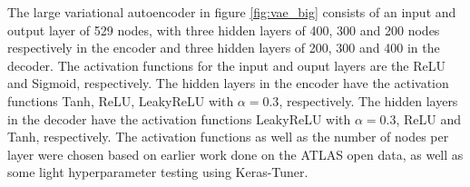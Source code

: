 The large variational autoencoder in figure \ref{fig:vae_big} consists of an input and output layer of 529 nodes, with three 
hidden layers of 400, 300 and 200 nodes respectively in the encoder and three hidden layers of 200, 300 and 400 in the decoder. 
The activation functions for the input and ouput layers are the ReLU and Sigmoid, respectively. The hidden 
layers in the encoder have the activation functions Tanh, ReLU, LeakyReLU with $\alpha=0.3$, respectively. The hidden layers
in the decoder have the activation functions LeakyReLU with $\alpha=0.3$, ReLU and Tanh, respectively. The activation functions 
as well as the number of nodes per layer were chosen based on earlier work done 
on the ATLAS open data\cite{fys5555}, as well as some light hyperparameter testing using Keras-Tuner\cite{omalley2019kerastuner}.